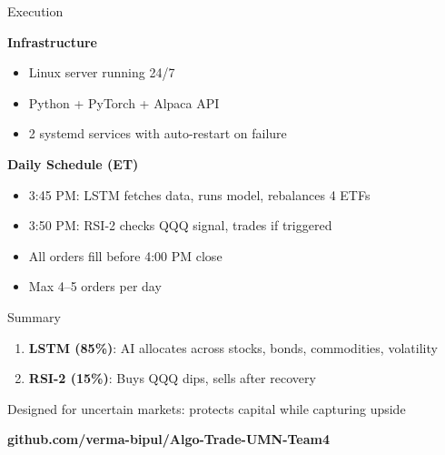 \documentclass[aspectratio=169]{beamer}
\begin{document}
\begin{frame}{Execution}

\large
\textbf{Infrastructure}
\begin{itemize}
    \item Linux server running 24/7
    \item Python + PyTorch + Alpaca API
    \item 2 systemd services with auto-restart on failure
\end{itemize}

\vspace{0.5cm}

\textbf{Daily Schedule (ET)}
\begin{itemize}
    \item 3:45 PM: LSTM fetches data, runs model, rebalances 4 ETFs
    \item 3:50 PM: RSI-2 checks QQQ signal, trades if triggered
    \item All orders fill before 4:00 PM close
    \item Max 4--5 orders per day
\end{itemize}

\end{frame}

\begin{frame}{Summary}

\Large
\begin{enumerate}
    \item \textbf{LSTM (85\%)}: AI allocates across stocks, bonds, commodities, volatility
    \item \textbf{RSI-2 (15\%)}: Buys QQQ dips, sells after recovery
\end{enumerate}

\vspace{0.5cm}

\large
Designed for uncertain markets: protects capital while capturing upside

\vspace{0.5cm}

\centering
\Large
\textbf{github.com/verma-bipul/Algo-Trade-UMN-Team4}

\end{frame}
\end{document}
